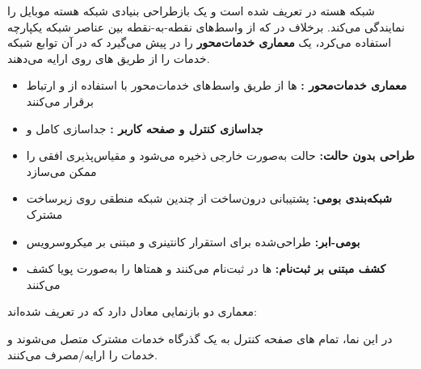 
شبکه هسته  در  تعریف شده است و یک بازطراحی بنیادی شبکه هسته موبایل را نمایندگی می‌کند. برخلاف  در  که از واسط‌های نقطه-به-نقطه بین عناصر شبکه یکپارچه استفاده می‌کرد،  یک \textbf{معماری خدمات‌محور } را در پیش می‌گیرد که در آن توابع شبکه  خدمات را از طریق های  روی  ارایه می‌دهند.


\begin{itemize}
\tightlist
\item
  \textbf{معماری خدمات‌محور :} ها از طریق واسط‌های خدمات‌محور  با استفاده از  و  ارتباط برقرار می‌کنند
\item
  \textbf{جداسازی کنترل و صفحه کاربر :} جداسازی کامل  و 
\item
  \textbf{طراحی  بدون حالت:} حالت به‌صورت خارجی ذخیره می‌شود  و مقیاس‌پذیری افقی را ممکن می‌سازد
\item
  \textbf{شبکه‌بندی بومی:} پشتیبانی درون‌ساخت از چندین شبکه منطقی روی زیرساخت مشترک
\item
  \textbf{بومی-ابر:} طراحی‌شده برای استقرار کانتینری و مبتنی بر میکروسرویس
\item
  \textbf{کشف  مبتنی بر ثبت‌نام:} ها در  ثبت‌نام می‌کنند و همتاها را به‌صورت پویا کشف می‌کنند
\end{itemize}



معماری  دو بازنمایی معادل دارد که در  تعریف شده‌اند:


در این نما، تمام های صفحه کنترل به یک گذرگاه خدمات مشترک متصل می‌شوند و خدمات را ارایه/\allowbreak{}مصرف می‌کنند.




